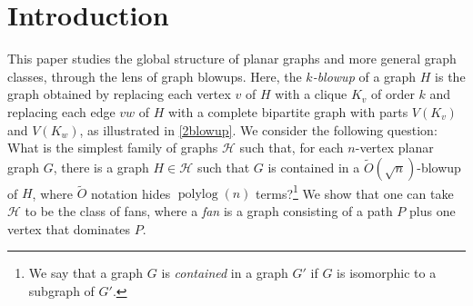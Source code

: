 \documentclass{patmorin}
\renewcommand{\leq}{\leqslant}
\newcommand{\david}[1]{{\color{orange} David: #1}}
\newcommand{\pat}[1]{\textcolor{Blue}{Pat: #1}}
\newcommand{\defin}[1]{\emph{\textcolor{brightmaroon}{#1}}}
\DeclareMathOperator{\polylog}{polylog}
\begin{document}
\newpage
\tableofcontents


\newpage
\section{Introduction}

%


This paper studies the global structure of planar graphs and more general graph classes, through the lens of graph blowups. Here, the \defin{$k$-blowup} of a graph $H$ is the graph obtained by replacing each vertex $v$ of $H$ with a clique $K_v$ of order $k$ and replacing each edge $vw$ of $H$ with a complete bipartite graph with parts $V(K_v)$ and $V(K_w)$, as illustrated in \cref{2blowup}. We consider the following question: What is the simplest family of graphs $\mathcal{H}$ such that, for each $n$-vertex planar graph $G$, there is a graph $H\in\mathcal{H}$ such that $G$ is contained in a $\tilde{O}(\sqrt{n})$-blowup of $H$, where $\tilde{O}$ notation hides $\polylog(n)$ terms?\footnote{We say that a graph $G$ is \defin{contained} in a graph $G'$ if $G$ is isomorphic to a subgraph of $G'$.} We show that one can  take $\mathcal{H}$ to be the class of fans,
where a \defin{fan} is a graph consisting of a path $P$ plus one vertex that dominates $P$.
\end{document}
